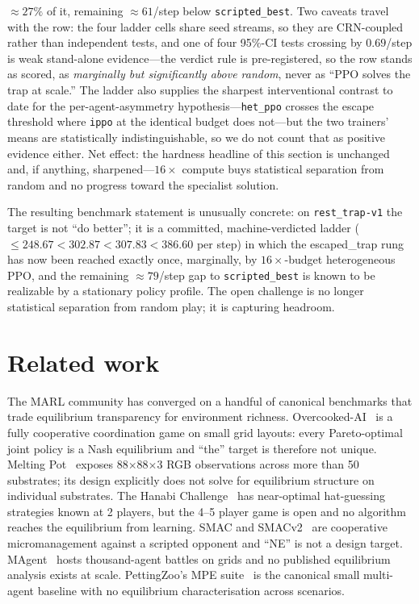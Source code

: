 \documentclass{anvil-paper}
\begin{document}
${\approx}27\%$ of it, remaining ${\approx}61$/step below
\texttt{scripted\_best}. Two caveats travel with the row: the four
ladder cells share seed streams, so they are CRN-coupled rather than
independent tests, and one of four 95\%-CI tests crossing by
$0.69$/step is weak stand-alone evidence---the verdict rule is
pre-registered, so the row stands as scored, as \emph{marginally but
significantly above random}, never as ``PPO solves the trap at
scale.'' The ladder also supplies the sharpest interventional contrast
to date for the per-agent-asymmetry hypothesis---\texttt{het\_ppo}
crosses the escape threshold where \texttt{ippo} at the identical
budget does not---but the two trainers' means are statistically
indistinguishable, so we do not count that as positive evidence
either. Net effect: the hardness headline of this section is
unchanged and, if anything, sharpened---$16{\times}$ compute buys
statistical separation from random and no progress toward the
specialist solution.

The resulting benchmark statement is unusually concrete: on
\texttt{rest\_trap-v1} the target is not ``do better''; it is a
committed, machine-verdicted ladder
(${\leq}248.67 < 302.87 < 307.83 < 386.60$ per step) in which the
\textsf{escaped\_trap} rung has now been reached exactly once,
marginally, by $16{\times}$-budget heterogeneous PPO, and the remaining
${\approx}79$/step gap to \texttt{scripted\_best} is known to be
realizable by a stationary policy profile. The open challenge is no
longer statistical separation from random play; it is capturing
headroom.

\section{Related work}
\label{sec:related}

The MARL community has converged on a handful of canonical benchmarks that
trade equilibrium transparency for environment richness.
Overcooked-AI~\citep{overcooked2019} is a fully cooperative coordination
game on small grid layouts: every Pareto-optimal joint policy is a Nash
equilibrium and ``the'' target is therefore not unique. Melting
Pot~\citep{meltingpot2021} exposes 88$\times$88$\times$3 RGB observations
across more than 50 substrates; its design explicitly does not solve for
equilibrium structure on individual substrates. The Hanabi
Challenge~\citep{hanabi2020} has near-optimal hat-guessing strategies known
at 2 players, but the 4--5 player game is open and no algorithm reaches the
equilibrium from learning. SMAC and SMACv2~\citep{smac2019,smacv2_2023} are
cooperative micromanagement against a scripted opponent and ``NE'' is not a
design target. MAgent~\citep{magent2018} hosts thousand-agent battles on
grids and no published equilibrium analysis exists at scale.
PettingZoo's MPE suite~\citep{pettingzoo2021} is the canonical small
multi-agent baseline with no equilibrium characterisation across scenarios.
\end{document}
